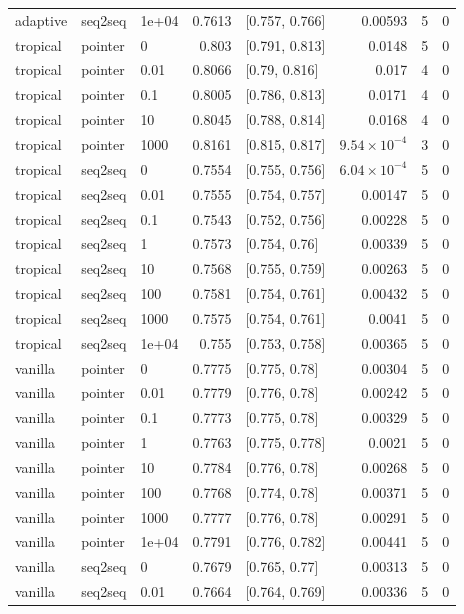 \documentclass[10pt]{article}
\begin{document}
{\begin{longtable}{lllrlrrr}
adaptive & seq2seq & 1e+04 & 0.7613 & [0.757, 0.766] & 0.00593 & 5 & 0\\
tropical & pointer & 0 & 0.803 & [0.791, 0.813] & 0.0148 & 5 & 0\\
tropical & pointer & 0.01 & 0.8066 & [0.79, 0.816] & 0.017 & 4 & 0\\
tropical & pointer & 0.1 & 0.8005 & [0.786, 0.813] & 0.0171 & 4 & 0\\
tropical & pointer & 10 & 0.8045 & [0.788, 0.814] & 0.0168 & 4 & 0\\
tropical & pointer & 1000 & 0.8161 & [0.815, 0.817] & $9.54\times10^{-4}$ & 3 & 0\\
tropical & seq2seq & 0 & 0.7554 & [0.755, 0.756] & $6.04\times10^{-4}$ & 5 & 0\\
tropical & seq2seq & 0.01 & 0.7555 & [0.754, 0.757] & 0.00147 & 5 & 0\\
tropical & seq2seq & 0.1 & 0.7543 & [0.752, 0.756] & 0.00228 & 5 & 0\\
tropical & seq2seq & 1 & 0.7573 & [0.754, 0.76] & 0.00339 & 5 & 0\\
tropical & seq2seq & 10 & 0.7568 & [0.755, 0.759] & 0.00263 & 5 & 0\\
tropical & seq2seq & 100 & 0.7581 & [0.754, 0.761] & 0.00432 & 5 & 0\\
tropical & seq2seq & 1000 & 0.7575 & [0.754, 0.761] & 0.0041 & 5 & 0\\
tropical & seq2seq & 1e+04 & 0.755 & [0.753, 0.758] & 0.00365 & 5 & 0\\
vanilla & pointer & 0 & 0.7775 & [0.775, 0.78] & 0.00304 & 5 & 0\\
vanilla & pointer & 0.01 & 0.7779 & [0.776, 0.78] & 0.00242 & 5 & 0\\
vanilla & pointer & 0.1 & 0.7773 & [0.775, 0.78] & 0.00329 & 5 & 0\\
vanilla & pointer & 1 & 0.7763 & [0.775, 0.778] & 0.0021 & 5 & 0\\
vanilla & pointer & 10 & 0.7784 & [0.776, 0.78] & 0.00268 & 5 & 0\\
vanilla & pointer & 100 & 0.7768 & [0.774, 0.78] & 0.00371 & 5 & 0\\
vanilla & pointer & 1000 & 0.7777 & [0.776, 0.78] & 0.00291 & 5 & 0\\
vanilla & pointer & 1e+04 & 0.7791 & [0.776, 0.782] & 0.00441 & 5 & 0\\
vanilla & seq2seq & 0 & 0.7679 & [0.765, 0.77] & 0.00313 & 5 & 0\\
vanilla & seq2seq & 0.01 & 0.7664 & [0.764, 0.769] & 0.00336 & 5 & 0\\

\end{longtable}}
\end{document}
